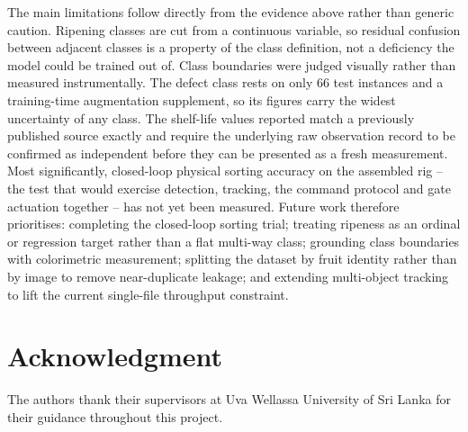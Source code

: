 \documentclass[journal]{IEEEtran}
\begin{document}
The main limitations follow directly from the evidence above rather than generic caution. Ripening classes are cut from a continuous variable, so residual confusion between adjacent classes is a property of the class definition, not a deficiency the model could be trained out of. Class boundaries were judged visually rather than measured instrumentally. The defect class rests on only 66 test instances and a training-time augmentation supplement, so its figures carry the widest uncertainty of any class. The shelf-life values reported match a previously published source exactly and require the underlying raw observation record to be confirmed as independent before they can be presented as a fresh measurement. Most significantly, closed-loop physical sorting accuracy on the assembled rig -- the test that would exercise detection, tracking, the command protocol and gate actuation together -- has not yet been measured. Future work therefore prioritises: completing the closed-loop sorting trial; treating ripeness as an ordinal or regression target rather than a flat multi-way class; grounding class boundaries with colorimetric measurement; splitting the dataset by fruit identity rather than by image to remove near-duplicate leakage; and extending multi-object tracking to lift the current single-file throughput constraint.

\section*{Acknowledgment}
The authors thank their supervisors at Uva Wellassa University of Sri Lanka for their guidance throughout this project.
\end{document}
